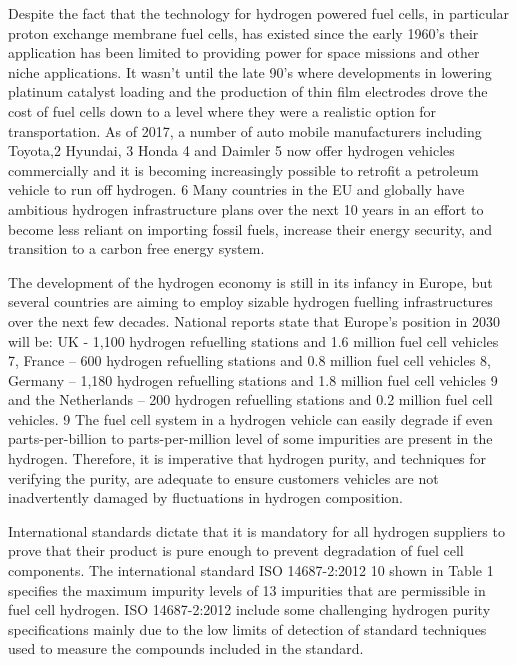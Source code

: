 \documentclass{report}
\begin{document}
Despite the fact that the technology for hydrogen powered fuel cells, in particular proton exchange membrane fuel cells, has existed since the early 1960’s their application has been limited to providing power for space missions and other niche applications. It wasn’t until the late 90’s where developments in lowering platinum catalyst loading and the production of thin film electrodes drove the cost of fuel cells down to a level where they were a realistic option for transportation. As of 2017, a number of auto mobile manufacturers including Toyota,2 Hyundai, 3 Honda 4 and Daimler 5 now offer hydrogen vehicles commercially and it is becoming increasingly possible to retrofit a petroleum vehicle to run off hydrogen. 6 Many countries in the EU and globally have ambitious hydrogen infrastructure plans over the next 10 years in an effort to become less reliant on importing fossil fuels, increase their energy security, and transition to a carbon free energy system.

The development of the hydrogen economy is still in its infancy in Europe, but several countries are aiming to employ sizable hydrogen fuelling infrastructures over the next few decades. National reports state that Europe’s position in 2030 will be: UK - 1,100 hydrogen refuelling stations and 1.6 million fuel cell vehicles 7, France – 600 hydrogen refuelling stations and 0.8 million fuel cell vehicles 8, Germany – 1,180 hydrogen refuelling stations and 1.8 million fuel cell vehicles 9 and the Netherlands – 200 hydrogen refuelling stations and 0.2 million fuel cell vehicles. 9 The fuel cell system in a hydrogen vehicle can easily degrade if even parts-per-billion to parts-per-million level of some impurities are present in the hydrogen. Therefore, it is imperative that hydrogen purity, and techniques for verifying the purity, are adequate to ensure customers vehicles are not inadvertently damaged by fluctuations in hydrogen composition. 

International standards dictate that it is mandatory for all hydrogen suppliers to prove that their product is pure enough to prevent degradation of fuel cell components. The international standard ISO 14687-2:2012 10 shown in Table 1 specifies the maximum impurity levels of 13 impurities that are permissible in fuel cell hydrogen. ISO 14687-2:2012 include some challenging hydrogen purity specifications mainly due to the low limits of detection of standard techniques used to measure the compounds included in the standard. 
\end{document}
